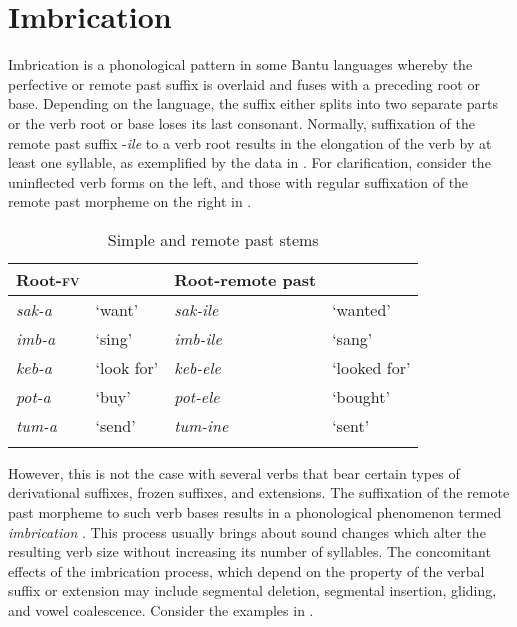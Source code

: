 \documentclass[output=paper]{langsci/langscibook}
\begin{document}
\section{Imbrication} \label{§4:imbrication.kawasha}

Imbrication is a phonological pattern in some Bantu languages whereby the perfective or remote past suffix is overlaid and fuses with a preceding root or base. Depending on the language, the suffix either splits into two separate parts or the verb root or base loses its last consonant. Normally, suffixation of the remote past suffix -\textit{ile} to a verb root results in the elongation of the verb by at least one syllable, as exemplified by the data in . For clarification, consider the uninflected verb forms on the left, and those with regular suffixation of the remote past morpheme on the right in . 

\begin{table}
\begin{tabularx}{.75\textwidth}{XXlX}
\lsptoprule
Root-\textsc{fv} &  & Root-remote past & \\
\midrule
\textit{sak-a} & `want' & \textit{sak-ile} & `wanted' \\
\textit{imb-a} & `sing' & \textit{imb-ile} & `sang' \\
\textit{keb-a} & `look for' & \textit{keb-ele} & `looked for' \\
\textit{pot-a} & `buy' & \textit{pot-ele} & `bought' \\
\textit{tum-a} & `send' & \textit{tum-ine} & `sent' \\

\lspbottomrule
\end{tabularx}

\caption{Simple and remote past stems}
\label{tab:18.kawasha}

\end{table}

However, this is not the case with several verbs that bear certain types of derivational suffixes, frozen suffixes, and extensions. The suffixation of the remote past morpheme to such verb bases results in a phonological phenomenon termed \textit{imbrication} \citep{bastin1983}. This process usually brings about sound changes which alter the resulting verb size without increasing its number of syllables. The concomitant effects of the imbrication process, which depend on the property of the verbal suffix or extension may include segmental deletion, segmental insertion, gliding, and vowel coalescence. Consider the examples in . 
\end{document}

